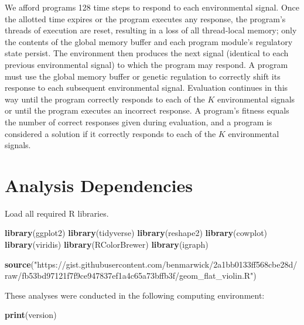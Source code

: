 \documentclass[]{book}
\newenvironment{Shaded}{\begin{snugshade}}{\end{snugshade}}
\newcommand{\KeywordTok}[1]{\textcolor[rgb]{0.13,0.29,0.53}{\textbf{#1}}}
\newcommand{\NormalTok}[1]{#1}
\newcommand{\StringTok}[1]{\textcolor[rgb]{0.31,0.60,0.02}{#1}}
\begin{document}
We afford programs 128 time steps to respond to each environmental signal.
Once the allotted time expires or the program executes any response, the program's threads of execution are reset, resulting in a loss of all thread-local memory; only the contents of the global memory buffer and each program module's regulatory state persist.
The environment then produces the next signal (identical to each previous environmental signal) to which the program may respond.
A program must use the global memory buffer or genetic regulation to correctly shift its response to each subsequent environmental signal.
Evaluation continues in this way until the program correctly responds to each of the \(K\) environmental signals or until the program executes an incorrect response.
A program's fitness equals the number of correct responses given during evaluation, and a program is considered a solution if it correctly responds to each of the \(K\) environmental signals.

\hypertarget{analysis-dependencies-1}{%
\section{Analysis Dependencies}\label{analysis-dependencies-1}}

Load all required R libraries.

\begin{Shaded}
\begin{Highlighting}[]
\KeywordTok{library}\NormalTok{(ggplot2)}
\KeywordTok{library}\NormalTok{(tidyverse)}
\KeywordTok{library}\NormalTok{(reshape2)}
\KeywordTok{library}\NormalTok{(cowplot)}
\KeywordTok{library}\NormalTok{(viridis)}
\KeywordTok{library}\NormalTok{(RColorBrewer)}
\KeywordTok{library}\NormalTok{(igraph)}

\KeywordTok{source}\NormalTok{(}\StringTok{"https://gist.githubusercontent.com/benmarwick/2a1bb0133ff568cbe28d/raw/fb53bd97121f7f9ce947837ef1a4c65a73bffb3f/geom_flat_violin.R"}\NormalTok{)}
\end{Highlighting}
\end{Shaded}

These analyses were conducted in the following computing environment:

\begin{Shaded}
\begin{Highlighting}[]
\KeywordTok{print}\NormalTok{(version)}
\end{Highlighting}
\end{Shaded}
\end{document}
